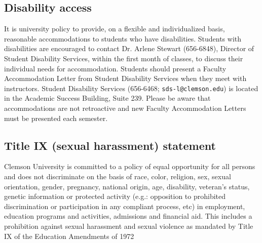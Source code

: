 \documentclass[12pt]{article}
\begin{document}
\subsection{Disability access}

It is university policy to provide, on a flexible and individualized basis, reasonable accommodations to students who have disabilities. Students with disabilities are encouraged to contact Dr. Arlene Stewart (656-6848), Director of Student Disability Services, within the first month of classes, to discuss their individual needs for accommodation. Students should present a Faculty Accommodation Letter from Student Disability Services when they meet with instructors. Student Disability Services (656-6468; \texttt{sds-l@clemson.edu}) is located in the Academic Success Building, Suite 239. Please be aware that accommodations are not retroactive and new Faculty Accommodation Letters must be presented each semester.

\subsection{Title IX (sexual harassment) statement}

Clemson University is committed to a policy of equal opportunity for all persons and does not discriminate on the basis of race, color, religion, sex, sexual orientation, gender, pregnancy, national origin, age, disability, veteran's status, genetic information or protected activity (e.g.: opposition to prohibited discrimination or participation in any compliant process, etc) in employment, education programs and activities, admissions and financial aid. This includes a prohibition against sexual harassment and sexual violence as mandated by Title IX of the Education Amendments of 1972
\end{document}
